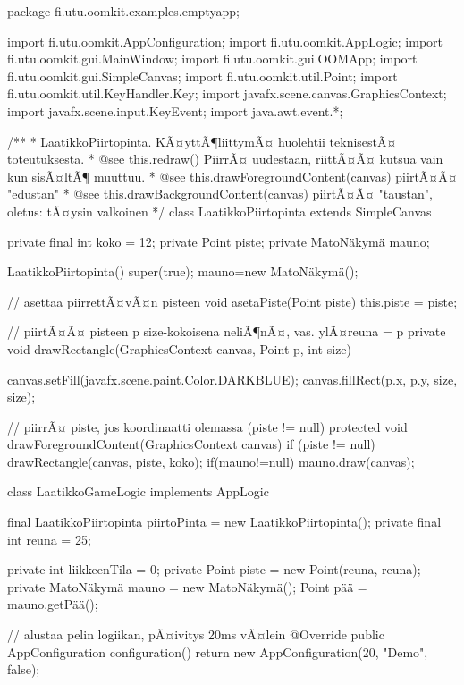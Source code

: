 \begin{javacode}
package fi.utu.oomkit.examples.emptyapp;



import fi.utu.oomkit.AppConfiguration;
import fi.utu.oomkit.AppLogic;
import fi.utu.oomkit.gui.MainWindow;
import fi.utu.oomkit.gui.OOMApp;
import fi.utu.oomkit.gui.SimpleCanvas;
import fi.utu.oomkit.util.Point;
import fi.utu.oomkit.util.KeyHandler.Key;
import javafx.scene.canvas.GraphicsContext;
import javafx.scene.input.KeyEvent;
import java.awt.event.*;

/**
 * LaatikkoPiirtopinta. KÃ¤yttÃ¶liittymÃ¤ huolehtii teknisestÃ¤ toteutuksesta.
 * @see this.redraw() PiirrÃ¤ uudestaan, riittÃ¤Ã¤ kutsua vain kun sisÃ¤ltÃ¶ muuttuu.
 * @see this.drawForegroundContent(canvas) piirtÃ¤Ã¤ "edustan"
 * @see this.drawBackgroundContent(canvas) piirtÃ¤Ã¤ "taustan", oletus: tÃ¤ysin valkoinen
 */
class LaatikkoPiirtopinta extends SimpleCanvas {
    private final int koko = 12;
    private Point piste;
    private MatoNäkymä mauno;

    LaatikkoPiirtopinta() { super(true);
    mauno=new MatoNäkymä();}

    // asettaa piirrettÃ¤vÃ¤n pisteen
    void asetaPiste(Point piste) {
        this.piste = piste;
    }

    // piirtÃ¤Ã¤ pisteen p size-kokoisena neliÃ¶nÃ¤, vas. ylÃ¤reuna = p
    private void drawRectangle(GraphicsContext canvas, Point p, int size) {
        canvas.setFill(javafx.scene.paint.Color.DARKBLUE);
        canvas.fillRect(p.x, p.y, size, size);
        
        
    }

    // piirrÃ¤ piste, jos koordinaatti olemassa (piste != null)
    protected void drawForegroundContent(GraphicsContext canvas) {
        if (piste != null) {
        	drawRectangle(canvas, piste, koko);
        	}
        if(mauno!=null) {
        	mauno.draw(canvas);
        }
    }
}

class LaatikkoGameLogic implements AppLogic {
    final LaatikkoPiirtopinta piirtoPinta = new LaatikkoPiirtopinta();
    private final int reuna = 25;

    private int liikkeenTila = 0;
    private Point piste = new Point(reuna, reuna);
    private MatoNäkymä mauno = new MatoNäkymä();
    Point pää = mauno.getPää();
  

    // alustaa pelin logiikan, pÃ¤ivitys 20ms vÃ¤lein
    @Override
    public AppConfiguration configuration() {
        return new AppConfiguration(20, "Demo", false);
    }

}
\end{javacode}
